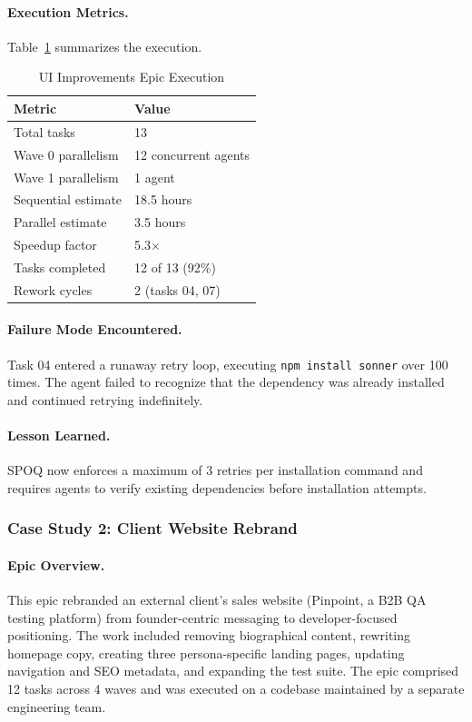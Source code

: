\paragraph{Execution Metrics.}
Table~\ref{tab:ui-metrics} summarizes the execution.

\begin{table}[htbp]
\centering
\caption{UI Improvements Epic Execution}
\label{tab:ui-metrics}
\begin{tabular}{ll}
\toprule
\textbf{Metric} & \textbf{Value} \\
\midrule
Total tasks & 13 \\
Wave 0 parallelism & 12 concurrent agents \\
Wave 1 parallelism & 1 agent \\
Sequential estimate & 18.5 hours \\
Parallel estimate & 3.5 hours \\
Speedup factor & 5.3$\times$ \\
Tasks completed & 12 of 13 (92\%) \\
Rework cycles & 2 (tasks 04, 07) \\
\bottomrule
\end{tabular}
\end{table}

\paragraph{Failure Mode Encountered.}
Task 04 entered a runaway retry loop, executing \texttt{npm install sonner}
over 100 times. The agent failed to recognize that the dependency was
already installed and continued retrying indefinitely.

\paragraph{Lesson Learned.}
SPOQ now enforces a maximum of 3 retries per installation command and
requires agents to verify existing dependencies before installation attempts.

\subsubsection{Case Study 2: Client Website Rebrand}
\label{subsubsec:rebrand-epic-detail}

\paragraph{Epic Overview.}
This epic rebranded an external client's sales website (Pinpoint, a B2B QA
testing platform) from founder-centric messaging to developer-focused
positioning. The work included removing biographical content, rewriting
homepage copy, creating three persona-specific landing pages, updating
navigation and SEO metadata, and expanding the test suite. The epic comprised
12 tasks across 4 waves and was executed on a codebase maintained by a
separate engineering team.

